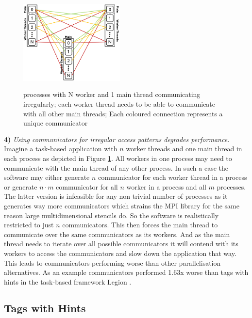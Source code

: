 \documentclass[sigconf]{acmart}
\begin{document}
\begin{figure}
    \caption{processes with N worker and 1 main thread communicating irregularly; each worker thread needs to be able to communicate with all other main threads; Each coloured connection represents a unique communicator}
    \includegraphics[width=0.47\textwidth]{Communicator_Irregular.png}
    \label{fig:Communicator_Irregular}
\end{figure}

\textbf{4)} \textit{Using communicators for irregular access patterns degrades performance.}
Imagine a task-based application with $n$ worker threads and one main thread in each process as depicted in Figure \ref{fig:Communicator_Irregular}.
All workers in one process may need to communicate with the main thread of any other process.
In such a case the software may either generate $n$ communicator for each worker thread in a process or generate $n \cdot m$ communicator for all $n$ worker in a process and all $m$ processes.
The latter version is infeasible for any non trivial number of processes as it generates way more communicators which strains the MPI library for the same reason large multidimensional stencils do.
So the software is realistically restricted to just $n$ communicators.
This then forces the main thread to communicate over the same communicators as its workers.
And as the main thread needs to iterate over all possible communicators it will contend with its workers to access the communicators and slow down the application that way.
This leads to communicators performing worse than other parallelisation alternatives.
As an example communicators performed 1.63x worse than tags with hints in the task-based framework Legion \cite{zambreLogicalParallel2021}.

\subsection{Tags with Hints}
\end{document}
